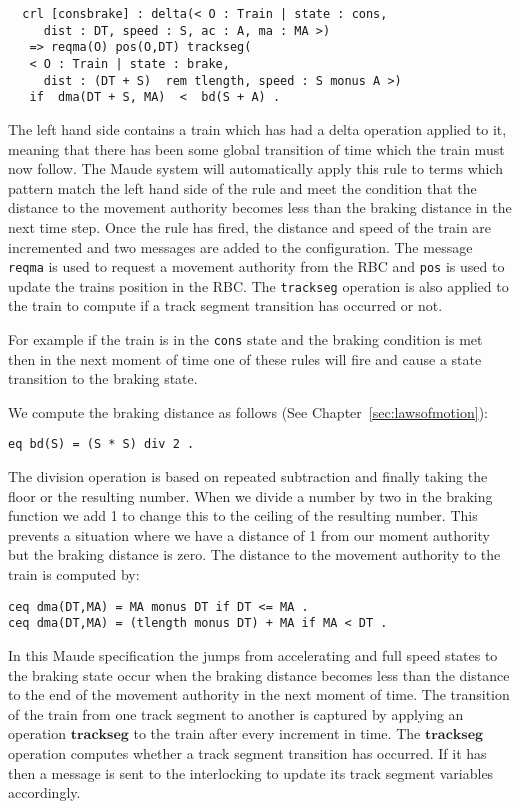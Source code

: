 \begin{lstlisting}
  crl [consbrake] : delta(< O : Train | state : cons, 
     dist : DT, speed : S, ac : A, ma : MA >)   
   => reqma(O) pos(O,DT) trackseg(
   < O : Train | state : brake, 
     dist : (DT + S)  rem tlength, speed : S monus A >)    
   if  dma(DT + S, MA)  <  bd(S + A) .
\end{lstlisting}

The left hand side contains a train which has had a delta operation applied to it, meaning that there has been some global transition of time which the train must now follow. The Maude system will automatically apply this rule to terms which pattern match the left hand side of the rule and meet the condition that the distance to the movement authority becomes less than the braking distance in the next time step. Once the rule has fired, the distance and speed of the train are incremented and two messages are added to the configuration. The message \texttt{reqma} is used to request a movement authority from the RBC and \texttt{pos} is used to update the trains position in the RBC. The \texttt{trackseg} operation is also applied to the train to compute if a track segment transition has occurred or not. 

For example if the train is in the \texttt{cons} state and the braking condition is met then in the next moment of time one of these rules will fire and cause a state transition to the braking state. 

We compute the braking distance as follows (See Chapter~\ref{sec:lawsofmotion}): 
\begin{center}\texttt{eq bd(S) = (S * S) div 2 .}\end{center}


The division operation is based on repeated subtraction and finally taking the floor or the resulting number. When we divide a number by two in the braking function we add 1 to change this to the ceiling of the resulting number. This prevents a situation where we have a distance of 1 from our moment authority but the braking distance is zero.
The distance to the movement authority to the train is computed by:
\begin{center}
\texttt{ceq dma(DT,MA) = MA monus DT if DT <= MA .} \\
\texttt{ceq dma(DT,MA) = (tlength monus DT) + MA if MA < DT .}
\end{center}

In this Maude specification the jumps from accelerating and full speed states to the braking state occur when the braking distance becomes less than the distance to the end of the movement authority in the next moment of time.  The transition of the train from one track segment to another is captured by applying an operation $\textbf{trackseg}$ to the train after every increment in time. The $\textbf{trackseg}$ operation computes whether a track segment transition has occurred. If it has then a message is sent to the interlocking to update its track segment variables accordingly.

